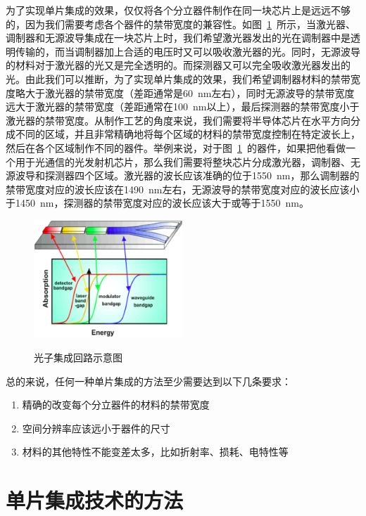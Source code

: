 \documentclass{ZJUthesis}
\begin{document}
为了实现单片集成的效果，仅仅将各个分立器件制作在同一块芯片上是远远不够的，因为我们需要考虑各个器件的禁带宽度的兼容性。如图~\ref{fig_pic}~所示，当激光器、调制器和无源波导集成在一块芯片上时，我们希望激光器发出的光在调制器中是透明传输的，而当调制器加上合适的电压时又可以吸收激光器的光。同时，无源波导的材料对于激光器的光又是完全透明的。而探测器又可以完全吸收激光器发出的光。由此我们可以推断，为了实现单片集成的效果，我们希望调制器材料的禁带宽度略大于激光器的禁带宽度（差距通常是60~nm左右），同时无源波导的禁带宽度远大于激光器的禁带宽度（差距通常在100~nm以上），最后探测器的禁带宽度小于激光器的禁带宽度。从制作工艺的角度来说，我们需要将半导体芯片在水平方向分成不同的区域，并且非常精确地将每个区域的材料的禁带宽度控制在特定波长上，然后在各个区域制作不同的器件。举例来说，对于图~\ref{fig_pic}~的器件，如果把他看做一个用于光通信的光发射机芯片，那么我们需要将整块芯片分成激光器，调制器、无源波导和探测器四个区域。激光器的波长应该准确的位于1550~nm，那么调制器的禁带宽度对应的波长应该在1490~nm左右，无源波导的禁带宽度对应的波长应该小于1450~nm，探测器的禁带宽度对应的波长应该大于或等于1550~nm。

\begin{figure}[htbp]
  \centering
  \includegraphics[width=0.5\textwidth]{./Pictures/pic.eps}\\
  \caption{光子集成回路示意图}
  \label{fig_pic}
\end{figure}

总的来说，任何一种单片集成的方法至少需要达到以下几条要求：

\begin{enumerate}
\item{精确的改变每个分立器件的材料的禁带宽度}
\item{空间分辨率应该远小于器件的尺寸}
\item{材料的其他特性不能变差太多，比如折射率、损耗、电特性等}
\end{enumerate}

\section{单片集成技术的方法}
\end{document}
